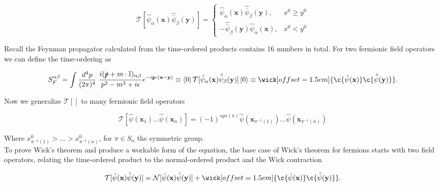 \begin{equation}
\mathcal{T} [ \hat{\psi}_\alpha (\textbf{x}) \hat{\bar{\psi}}_\beta (\textbf{y}) ] =
	\begin{cases}
      		\hat{\psi}_\alpha (\textbf{x}) \hat{\bar{\psi}}_\beta (\textbf{y}) , & x^0 \ge y^0 \\
      		-\hat{\bar{\psi}}_\beta (\textbf{y})\hat{\psi}_\alpha (\textbf{x}) , & x^0 < y^0
    	\end{cases}
\end{equation}

\noindent Recall the Feynman propagator calculated from the time-ordered products contains 16 numbers in total. For two fermionic field operators we can define the time-ordering as

\begin{equation}
S_F^{\alpha \beta} = \int \frac{d^4 p}{(2 \pi)^4} \,\, \frac{i (\slashed{p} + m \cdot \mathbb{I})_{\alpha \beta} }{ p^2 - m^2 + i \epsilon} e^{-i \textbf{p} \cdot (\textbf{x} - \textbf{y})} \equiv \bra{0} \mathcal{T} [ \hat{\psi}_\alpha (\textbf{x}) \hat{\bar{\psi}}_\beta (\textbf{y}) ] \ket{0} \equiv \wick[offset=1.5em]{\c {\hat{\psi} (\textbf{x})} \c {\hat{\bar{\psi}} (\textbf{y})}}.
\end{equation}

\noindent Now we generalize $\mathcal{T}[]$ to many fermionic field operators

\begin{equation}
\mathcal{T} [ \hat{\psi} (\textbf{x}_1) \dots \hat{\psi} (\textbf{x}_n) ] = (-1)^{sgn(\pi)} \hat{\psi} (\textbf{x}_{\pi^{-1}(1)}) \dots \hat{\psi} (\textbf{x}_{\pi^{-1}(n)})
\end{equation}

\noindent Where $x^0_{\pi^{-1}(1)} > \dots > x^0_{\pi^{-1}(n)} $, for $\pi \in S_n$ the symmetric group. \\

\noindent To prove Wick's theorem and produce a workable form of the equation, the base case of Wick's theorem for fermions starts with two field operators, relating the time-ordered product to the normal-ordered product and the Wick contraction

\begin{equation}
\mathcal{T} [ \hat{\psi} (\textbf{x}) \hat{\bar{\psi}} (\textbf{y}) ] = \mathcal{N} [ \hat{\psi} (\textbf{x}) \hat{\bar{\psi}} (\textbf{y}) ] + \wick[offset=1.5em]{\c {\hat{\psi} (\textbf{x})} \c {\hat{\bar{\psi}} (\textbf{y})}}.
\end{equation}


